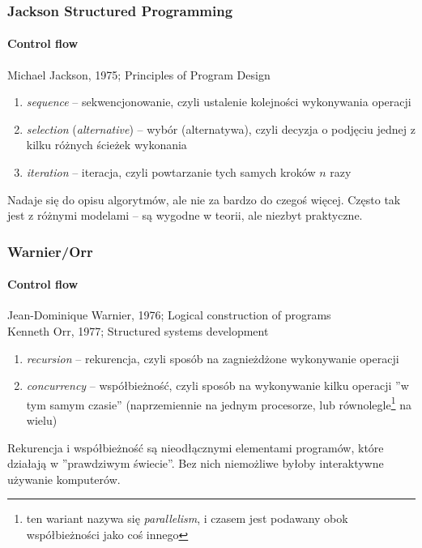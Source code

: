 \documentclass[aspectratio=169]{beamer}
\begin{document}
\begin{frame}
    \frametitle{Jackson Structured Programming}
    \framesubtitle{Control flow}

    Michael Jackson, 1975; Principles of Program Design

    \vspace{1em}

    \begin{enumerate}
        \item \emph{sequence} -- sekwencjonowanie, czyli ustalenie kolejności
            wykonywania operacji
        \item \emph{selection} (\emph{alternative}) -- wybór (alternatywa),
            czyli decyzja o podjęciu jednej z kilku różnych ścieżek wykonania
        \item \emph{iteration} -- iteracja, czyli powtarzanie tych samych kroków
            $n$ razy
    \end{enumerate}

    \vspace{1em}

    Nadaje się do opisu algorytmów, ale nie za bardzo do czegoś więcej. Często
    tak jest z różnymi modelami -- są wygodne w teorii, ale niezbyt praktyczne.
\end{frame}

\begin{frame}
    \frametitle{Warnier/Orr}
    \framesubtitle{Control flow}

    Jean-Dominique Warnier, 1976; Logical construction of programs\\
    Kenneth Orr, 1977; Structured systems development

    \vspace{1em}

    \begin{enumerate}
        \item \emph{recursion} -- rekurencja, czyli sposób na zagnieżdżone
            wykonywanie operacji
        \item \emph{concurrency} -- współbieżność, czyli sposób na wykonywanie
            kilku operacji ''w tym samym czasie'' (naprzemiennie na jednym
            procesorze, lub równolegle\footnote{ten wariant nazywa się
            \emph{parallelism}, i czasem jest podawany obok współbieżności jako
            coś innego} na wielu)
    \end{enumerate}

    \vspace{1em}

    Rekurencja i współbieżność są nieodłącznymi elementami programów, które
    działają w ''prawdziwym świecie''. Bez nich niemożliwe byłoby interaktywne
    używanie komputerów.
\end{frame}
\end{document}
